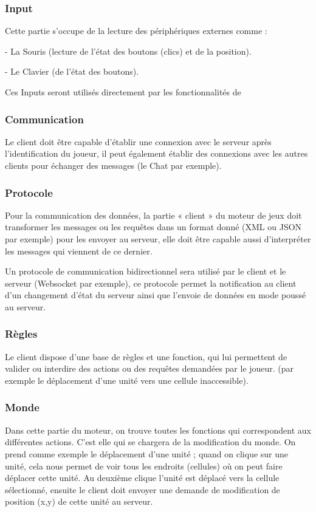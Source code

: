 \documentclass[a4paper,10pt]{report}
\begin{document}
\subsubsection{Input}

Cette partie s'occupe de la lecture des périphériques externes comme :

- La Souris (lecture de l'état des boutons (clics) et de la position).

- Le Clavier (de l'état des boutons).

Ces Inputs seront utilisés directement par les fonctionnalités de

\subsubsection{Communication}

Le client doit être capable d’établir une connexion avec le serveur après l’identification du joueur, il peut également établir des connexions avec les autres clients pour échanger des messages (le Chat par exemple).

\subsubsection{Protocole}

Pour la communication des données, la partie « client » du moteur de jeux doit transformer les messages ou les requêtes dans un format donné (XML ou JSON par exemple) pour les envoyer au serveur, elle doit être capable aussi d’interpréter les messages qui viennent de ce dernier.

Un protocole de communication bidirectionnel sera utilisé par le client et le serveur (Websocket par exemple), ce protocole permet la notification au client d’un changement d’état du serveur ainsi que l’envoie de données en mode poussé au serveur.

\subsubsection{Règles}

Le client dispose d’une base de règles et une fonction, qui lui permettent de valider ou interdire des actions ou des requêtes demandées par le joueur. (par exemple le déplacement d’une unité vers une cellule inaccessible).

\subsubsection{Monde}

Dans cette partie du moteur, on trouve toutes les fonctions qui correspondent aux différentes actions. C'est elle qui se chargera de la modification du monde. On prend comme exemple le déplacement d’une unité ; quand on clique sur une unité, cela nous permet de voir tous les endroits (cellules) où on peut faire déplacer cette unité. Au deuxième clique l’unité est déplacé vers la cellule sélectionné, ensuite le client doit envoyer une demande de modification de position (x,y) de cette unité au serveur.
\end{document}
